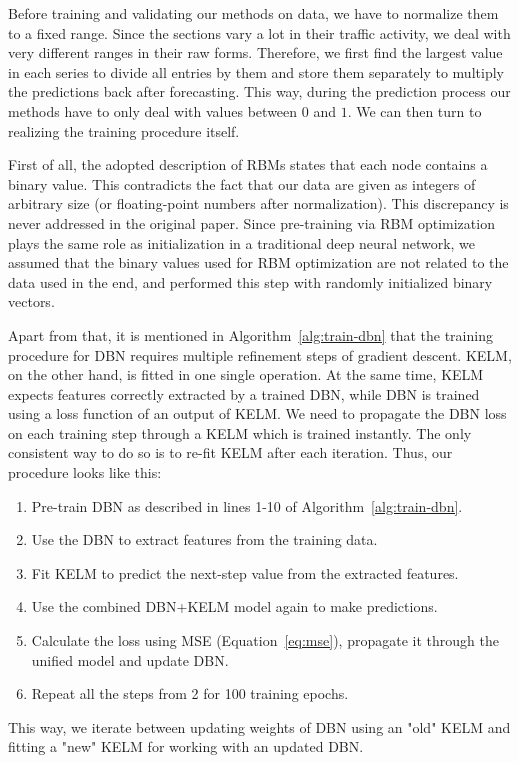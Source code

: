 Before training and validating our methods on data, we have to normalize them to
a fixed range. Since the sections vary a lot in their traffic activity, we deal
with very different ranges in their raw forms. Therefore, we first find the
largest value in each series to divide all entries by them and store them
separately to multiply the predictions back after forecasting. This way, during
the prediction process our methods have to only deal with values between $0$ and
$1$. We can then turn to realizing the training procedure itself.

First of all, the adopted description of RBMs states that each node contains a
binary value. This contradicts the fact that our data are given as integers of
arbitrary size (or floating-point numbers after normalization). This discrepancy
is never addressed in the original paper. Since pre-training via RBM
optimization plays the same role as initialization in a traditional deep neural
network, we assumed that the binary values used for RBM optimization are not
related to the data used in the end, and performed this step with randomly
initialized binary vectors.

Apart from that, it is mentioned in Algorithm~\ref{alg:train-dbn} that the
training procedure for DBN requires multiple refinement steps of gradient
descent. KELM, on the other hand, is fitted in one single operation. At the same
time, KELM expects features correctly extracted by a trained DBN, while DBN is
trained using a loss function of an output of KELM. We need to propagate the DBN
loss on each training step through a KELM which is trained instantly. The only
consistent way to do so is to re-fit KELM after each iteration. Thus, our 
procedure looks like this:
\begin{enumerate}
	\item Pre-train DBN as described in lines 1-10 of Algorithm~\ref{alg:train-dbn}.
	\item Use the DBN to extract features from the training data.
	\item Fit KELM to predict the next-step value from the extracted features.
	\item Use the combined DBN+KELM model again to make predictions.
	\item Calculate the loss using MSE (Equation~\ref{eq:mse}), propagate it
	through the unified model and update DBN.
	\item Repeat all the steps from 2 for 100 training epochs.
\end{enumerate}
This way, we iterate between updating weights of DBN using an "old" KELM and
fitting a "new" KELM for working with an updated DBN.

